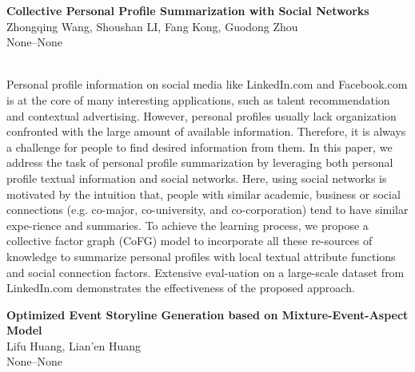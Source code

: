 \documentclass[twoside,makeidx]{book}
\begin{document}
\par\vspace{2em}\noindent%
\begin{minipage}{\linewidth}%
\begin{center}
\textbf{\normalsize Collective Personal Profile Summarization with Social Networks}\\
\normalsize  Zhongqing Wang,  Shoushan LI,  Fang Kong,  Guodong Zhou\\
{\small None--None}\\
\end{center}
\end{minipage}\\[0.5em]
\nopagebreak%
\noindent%
{\small Personal profile information on social media like LinkedIn.com and Facebook.com is at the core of many interesting applications, such as talent recommendation and contextual advertising. However, personal profiles usually lack organization confronted with the large amount of available information. Therefore, it is always a challenge for people to find desired information from them. In this paper, we address the task of personal profile summarization by leveraging both personal profile textual information and social networks. Here, using social networks is motivated by the intuition that, people with similar academic, business or social connections (e.g. co-major, co-university, and co-corporation) tend to have similar expe-rience and summaries. To achieve the learning process, we propose a collective factor graph (CoFG) model to incorporate all these re-sources of knowledge to summarize personal profiles with local textual attribute functions and social connection factors. Extensive eval-uation on a large-scale dataset from LinkedIn.com demonstrates the effectiveness of the proposed approach.}
\par\vspace{2em}\noindent%
\begin{minipage}{\linewidth}%
\begin{center}
\textbf{\normalsize Optimized Event Storyline Generation based on Mixture-Event-Aspect Model}\\
\normalsize  Lifu Huang,  Lian'en Huang\\
{\small None--None}\\
\end{center}
\end{minipage}\\[0.5em]
\nopagebreak%
\noindent%
\end{document}
